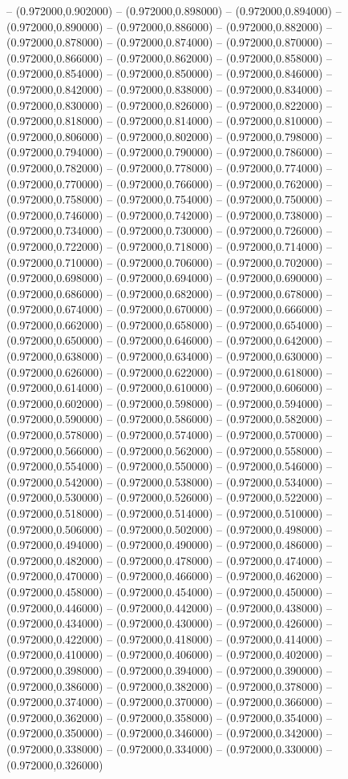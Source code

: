 -- (0.972000,0.902000) -- (0.972000,0.898000) -- (0.972000,0.894000) -- (0.972000,0.890000) -- (0.972000,0.886000) -- (0.972000,0.882000) -- (0.972000,0.878000) -- (0.972000,0.874000) -- (0.972000,0.870000) -- (0.972000,0.866000) -- (0.972000,0.862000) -- (0.972000,0.858000) -- (0.972000,0.854000) -- (0.972000,0.850000) -- (0.972000,0.846000) -- (0.972000,0.842000) -- (0.972000,0.838000) -- (0.972000,0.834000) -- (0.972000,0.830000) -- (0.972000,0.826000) -- (0.972000,0.822000) -- (0.972000,0.818000) -- (0.972000,0.814000) -- (0.972000,0.810000) -- (0.972000,0.806000) -- (0.972000,0.802000) -- (0.972000,0.798000) -- (0.972000,0.794000) -- (0.972000,0.790000) -- (0.972000,0.786000) -- (0.972000,0.782000) -- (0.972000,0.778000) -- (0.972000,0.774000) -- (0.972000,0.770000) -- (0.972000,0.766000) -- (0.972000,0.762000) -- (0.972000,0.758000) -- (0.972000,0.754000) -- (0.972000,0.750000) -- (0.972000,0.746000) -- (0.972000,0.742000) -- (0.972000,0.738000) -- (0.972000,0.734000) -- (0.972000,0.730000) -- (0.972000,0.726000) -- (0.972000,0.722000) -- (0.972000,0.718000) -- (0.972000,0.714000) -- (0.972000,0.710000) -- (0.972000,0.706000) -- (0.972000,0.702000) -- (0.972000,0.698000) -- (0.972000,0.694000) -- (0.972000,0.690000) -- (0.972000,0.686000) -- (0.972000,0.682000) -- (0.972000,0.678000) -- (0.972000,0.674000) -- (0.972000,0.670000) -- (0.972000,0.666000) -- (0.972000,0.662000) -- (0.972000,0.658000) -- (0.972000,0.654000) -- (0.972000,0.650000) -- (0.972000,0.646000) -- (0.972000,0.642000) -- (0.972000,0.638000) -- (0.972000,0.634000) -- (0.972000,0.630000) -- (0.972000,0.626000) -- (0.972000,0.622000) -- (0.972000,0.618000) -- (0.972000,0.614000) -- (0.972000,0.610000) -- (0.972000,0.606000) -- (0.972000,0.602000) -- (0.972000,0.598000) -- (0.972000,0.594000) -- (0.972000,0.590000) -- (0.972000,0.586000) -- (0.972000,0.582000) -- (0.972000,0.578000) -- (0.972000,0.574000) -- (0.972000,0.570000) -- (0.972000,0.566000) -- (0.972000,0.562000) -- (0.972000,0.558000) -- (0.972000,0.554000) -- (0.972000,0.550000) -- (0.972000,0.546000) -- (0.972000,0.542000) -- (0.972000,0.538000) -- (0.972000,0.534000) -- (0.972000,0.530000) -- (0.972000,0.526000) -- (0.972000,0.522000) -- (0.972000,0.518000) -- (0.972000,0.514000) -- (0.972000,0.510000) -- (0.972000,0.506000) -- (0.972000,0.502000) -- (0.972000,0.498000) -- (0.972000,0.494000) -- (0.972000,0.490000) -- (0.972000,0.486000) -- (0.972000,0.482000) -- (0.972000,0.478000) -- (0.972000,0.474000) -- (0.972000,0.470000) -- (0.972000,0.466000) -- (0.972000,0.462000) -- (0.972000,0.458000) -- (0.972000,0.454000) -- (0.972000,0.450000) -- (0.972000,0.446000) -- (0.972000,0.442000) -- (0.972000,0.438000) -- (0.972000,0.434000) -- (0.972000,0.430000) -- (0.972000,0.426000) -- (0.972000,0.422000) -- (0.972000,0.418000) -- (0.972000,0.414000) -- (0.972000,0.410000) -- (0.972000,0.406000) -- (0.972000,0.402000) -- (0.972000,0.398000) -- (0.972000,0.394000) -- (0.972000,0.390000) -- (0.972000,0.386000) -- (0.972000,0.382000) -- (0.972000,0.378000) -- (0.972000,0.374000) -- (0.972000,0.370000) -- (0.972000,0.366000) -- (0.972000,0.362000) -- (0.972000,0.358000) -- (0.972000,0.354000) -- (0.972000,0.350000) -- (0.972000,0.346000) -- (0.972000,0.342000) -- (0.972000,0.338000) -- (0.972000,0.334000) -- (0.972000,0.330000) -- (0.972000,0.326000) 